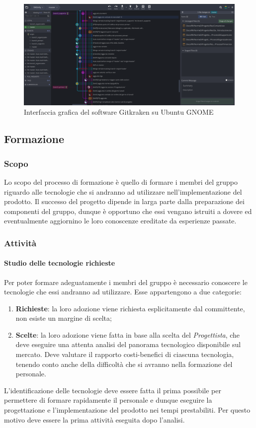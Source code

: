 \begin{figure}[H]
	\centering
	\includegraphics[width=1\textwidth]{Images/gitkraken.png}
	\caption{Interfaccia grafica del software Gitkraken su Ubuntu GNOME}
\end{figure}

\subsection{Formazione}

\subsubsection{Scopo}
Lo scopo del processo di formazione è quello di formare i membri del gruppo riguardo alle tecnologie che si andranno ad utilizzare nell'implementazione del prodotto. Il successo del progetto dipende in larga parte dalla preparazione dei componenti del gruppo, dunque è opportuno che essi vengano istruiti a dovere ed eventualmente aggiornino le loro conoscenze ereditate da esperienze passate.
\subsubsection{Attività}
	\paragraph{Studio delle tecnologie richieste} \Spazio
	Per poter formare adeguatamente i membri del gruppo è necessario conoscere le tecnologie che essi andranno ad utilizzare. Esse appartengono a due categorie: 
	\begin{enumerate}
		\item \textbf{Richieste}: la loro adozione viene richiesta esplicitamente dal committente, non esiste un margine di scelta;
		
		\item \textbf{Scelte}: la loro adozione viene fatta in base alla scelta del \emph{Progettista}, che deve eseguire una attenta analisi del panorama tecnologico disponibile sul mercato. Deve valutare il rapporto costi-benefici di ciascuna tecnologia, tenendo conto anche della difficoltà che si avranno nella formazione del personale.
	\end{enumerate}
	L'identificazione delle tecnologie deve essere fatta il prima possibile per permettere di formare rapidamente il personale e dunque eseguire la progettazione e l'implementazione del prodotto nei tempi prestabiliti. Per questo motivo deve essere la prima attività eseguita dopo l'analisi. 

